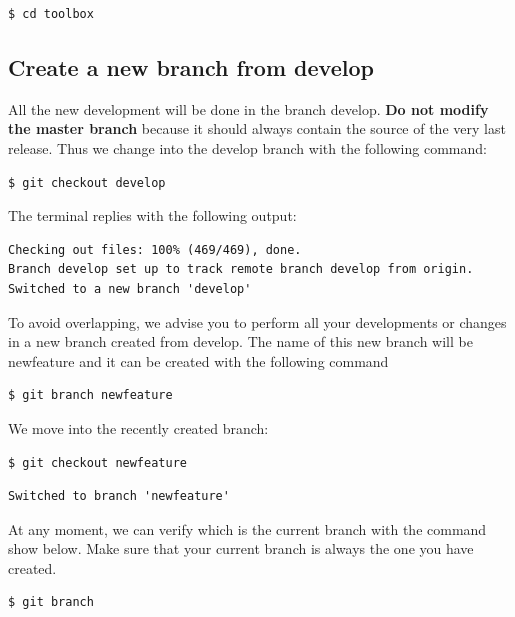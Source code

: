 \documentclass[10pt,a4paper]{article}
\begin{document}
\begin{verbatim}
$ cd toolbox     
\end{verbatim}



\subsection{Create a new branch from develop }\label{create-a-new-branch-from-develop}

All the new development will be done in the branch develop. \textbf{Do not
modify the master branch} because it should always contain the source of
the very last release. Thus we change into the develop branch with the
following command:

\begin{verbatim}
$ git checkout develop    
\end{verbatim}

\noindent The terminal replies with the following output:

\begin{verbatim}
Checking out files: 100% (469/469), done.
Branch develop set up to track remote branch develop from origin.
Switched to a new branch 'develop'
\end{verbatim}

To avoid overlapping, we advise you to perform all your developments or
changes in a new branch created from develop. The name of this new
branch will be newfeature and it can be created with the following
command

\begin{verbatim}
$ git branch newfeature  
\end{verbatim}

\noindent We move into the recently created branch:\newline 

\begin{verbatim}
$ git checkout newfeature  
\end{verbatim}

\begin{verbatim}
Switched to branch 'newfeature'
\end{verbatim}



At any moment, we can verify which is the current branch with the
command show below. Make sure that your current branch is always the one you have created.

\begin{verbatim}
$ git branch
\end{verbatim}
\end{document}
